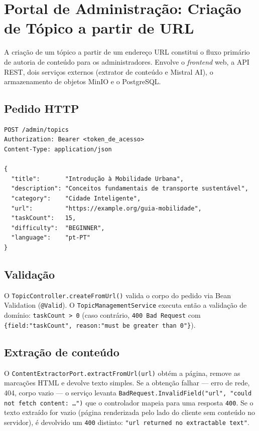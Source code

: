 \section{Portal de Administração: Criação de Tópico a partir de URL}
\label{sec:topic_criacao_url}

A criação de um tópico a partir de um endereço URL constitui o fluxo
primário de autoria de conteúdo para os administradores. Envolve o
\textit{frontend} web, a API REST, dois serviços externos (extrator de
conteúdo e Mistral AI), o armazenamento de objetos MinIO e o PostgreSQL.

\subsection*{Pedido HTTP}

\begin{verbatim}
POST /admin/topics
Authorization: Bearer <token_de_acesso>
Content-Type: application/json

{
  "title":       "Introdução à Mobilidade Urbana",
  "description": "Conceitos fundamentais de transporte sustentável",
  "category":    "Cidade Inteligente",
  "url":         "https://example.org/guia-mobilidade",
  "taskCount":   15,
  "difficulty":  "BEGINNER",
  "language":    "pt-PT"
}
\end{verbatim}

\subsection*{Validação}

O \texttt{TopicController.createFromUrl()} valida o corpo do pedido via
Bean Validation (\texttt{@Valid}).
O \texttt{TopicManagementService} executa então a validação de domínio:
\texttt{taskCount > 0} (caso contrário, \texttt{400 Bad Request} com
\texttt{\{field:"taskCount", reason:"must be greater than 0"\}}).

\subsection*{Extração de conteúdo}

O \texttt{ContentExtractorPort.extractFromUrl(url)} obtém a página, remove
as marcações HTML e devolve texto simples.
Se a obtenção falhar — erro de rede, 404, corpo vazio — o serviço levanta
\texttt{BadRequest.InvalidField("url", "could not fetch content: \ldots")}
que o controlador mapeia para uma resposta \texttt{400}.
Se o texto extraído for vazio (página renderizada pelo lado do cliente sem
conteúdo no servidor), é devolvido um \texttt{400} distinto:
\texttt{"url returned no extractable text"}.

